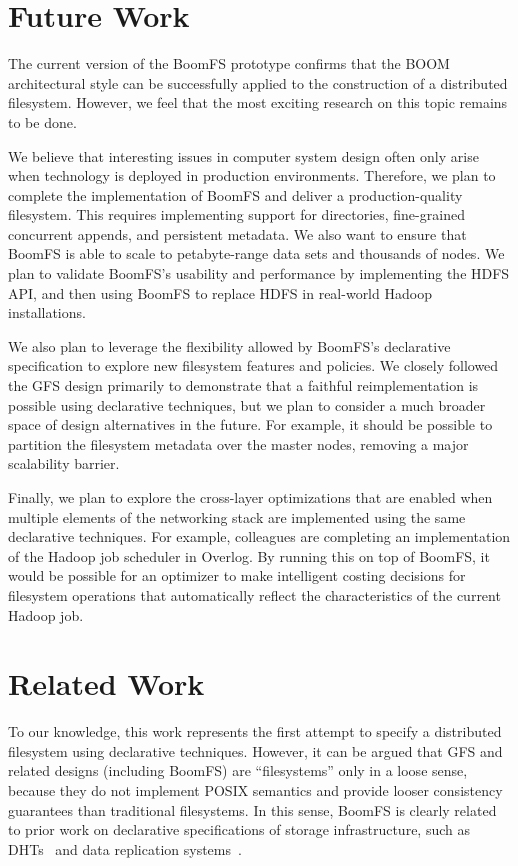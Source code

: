 \documentclass[twocolumn]{article}
\begin{document}
\section{Future Work}
\label{future-work}
The current version of the BoomFS prototype confirms that the BOOM
architectural style can be successfully applied to the construction of
a distributed filesystem. However, we feel that the most exciting
research on this topic remains to be done.

We believe that interesting issues in computer system design often
only arise when technology is deployed in production
environments. Therefore, we plan to complete the implementation of
BoomFS and deliver a production-quality filesystem. This requires
implementing support for directories, fine-grained concurrent appends,
and persistent metadata. We also want to ensure that BoomFS is able to
scale to petabyte-range data sets and thousands of nodes. We plan to
validate BoomFS's usability and performance by implementing the HDFS
API, and then using BoomFS to replace HDFS in real-world Hadoop
installations.

We also plan to leverage the flexibility allowed by BoomFS's
declarative specification to explore new filesystem features and
policies. We closely followed the GFS design primarily to demonstrate
that a faithful reimplementation is possible using declarative
techniques, but we plan to consider a much broader space of design
alternatives in the future. For example, it should be possible to
partition the filesystem metadata over the master nodes, removing a
major scalability barrier.

Finally, we plan to explore the cross-layer optimizations that are
enabled when multiple elements of the networking stack are implemented
using the same declarative techniques. For example, colleagues are
completing an implementation of the Hadoop job scheduler in
Overlog. By running this on top of BoomFS, it would be possible for an
optimizer to make intelligent costing decisions for filesystem
operations that automatically reflect the characteristics of the
current Hadoop job.

\section{Related Work}
\label{related-work}
To our knowledge, this work represents the first attempt to specify a
distributed filesystem using declarative techniques. However, it can
be argued that GFS and related designs (including BoomFS) are
``filesystems'' only in a loose sense, because they do not implement
POSIX semantics and provide looser consistency guarantees than
traditional filesystems. In this sense, BoomFS is clearly related to
prior work on declarative specifications of storage infrastructure,
such as DHTs~\cite{chord-overlog} and data replication
systems~\cite{padre-draft}.
\end{document}
